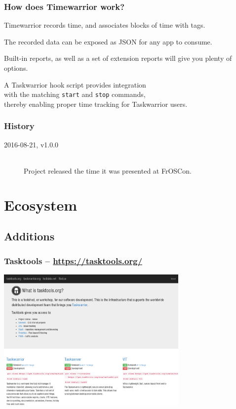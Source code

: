 \documentclass[t,handout,aspectratio=169]{beamer}
\begin{document}
\begin{frame}[fragile]\frametitle{How does Timewarrior work?}
    \vfill
    Timewarrior records time, and associates blocks of time with tags. \pause

    The recorded data can be exposed as JSON for any app to consume. \pause

    Built-in reports, as well as a set of extension reports will give you plenty of options. \pause

    A Taskwarrior hook script provides integration \\
    with the matching \verb=start= and \verb=stop= commands, \\
    thereby enabling proper time tracking for Taskwarrior users.
\end{frame}

\begin{frame}[fragile]\frametitle{History}
    \vfill
    \begin{description}
        \item[2016-08-21, v1.0.0]  \hfill \\
            Project released the time it was presented at FrOSCon.
    \end{description}
\end{frame}

\section{Ecosystem}

\subsection{Additions}

\begin{frame}[fragile]\frametitle{Tasktools -- \url{https://tasktools.org/}}
    \begin{center}
        \href{https://tasktools.org/}{\includegraphics[height=7cm]{tasktools-org.png}}
    \end{center}
\end{frame}
\end{document}
